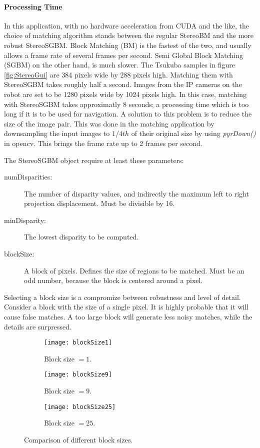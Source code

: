 \paragraph{Processing Time}
In this application, with no hardware acceleration from CUDA and the like, the choice of matching algorithm stands between the regular StereoBM and the more robust StereoSGBM. Block Matching (BM) is the fastest of the two, and usually allows a frame rate of several frames per second. Semi Global Block Matching (SGBM) on the other hand, is much slower. The Tsukuba samples in figure \ref{fig:StereoGui} are 384 pixels wide by 288 pixels high. Matching them with StereoSGBM takes roughly half a second. Images from the IP cameras on the robot are set to be 1280 pixels wide by 1024 pixels high. In this case, matching with StereoSGBM takes approximatly 8 seconds; a processing time which is too long if it is to be used for navigation. A solution to this problem is to reduce the size of the image pair. This was done in the matching application by downsampling the input images to $1/4th$ of their original size by using \textit{pyrDown()} in \gls{opencv}. This brings the frame rate up to 2 frames per second.

The StereoSGBM object require at least these parameters:

 \begin{description}
 	\item[numDisparities: ] The number of disparity values, and indirectly the maximum left to right projection displacement. Must be divisible by 16.
 	\item[minDisparity: ] The lowest disparity to be computed.
	\item[blockSize: ] A block of pixels. Defines the size of regions to be matched. Must be an odd number, because the block is centered around a pixel.
\end{description}

Selecting a block size is a compromize between robustness and level of detail. Consider a block with the size of a single pixel. It is highly probable that it will cause false matches. A too large block will generate less noisy matches, while the details are surpressed.

\begin{figure}
	\centering
	\begin{subfigure}[b]{0.30\textwidth}
		\texttt{[image: blockSize1]}
		\caption{Block size $= 1$.}
		\label{fig:block1}
	\end{subfigure}
	\begin{subfigure}[b]{0.30\textwidth}
		\texttt{[image: blockSize9]}
		\caption{Block size $= 9$.}
		\label{fig:block9}
	\end{subfigure}
	\begin{subfigure}[b]{0.30\textwidth}
		\texttt{[image: blockSize25]}
		\caption{Block size $= 25$.}
		\label{fig:block21}
	\end{subfigure}
	\caption{\label{fig:blockSize}Comparison of different block sizes.}
\end{figure}


